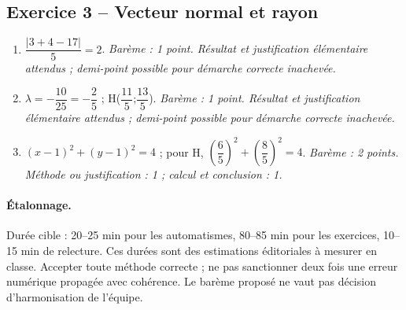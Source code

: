 \subsection*{Exercice 3 -- Vecteur normal et rayon}
\begin{enumerate}
\item $\dfrac{|3+4-17|}{5}=2$. \textit{Barème : 1 point. Résultat et justification élémentaire attendus ; demi-point possible pour démarche correcte inachevée.}
\item $\lambda =-\dfrac{10}{25}=-\dfrac{2}{5}$ ; H($\dfrac{11}{5}$;$\dfrac{13}{5}$). \textit{Barème : 1 point. Résultat et justification élémentaire attendus ; demi-point possible pour démarche correcte inachevée.}
\item $(x-1)^2+(y-1)^2=4$ ; pour H, $(\dfrac{6}{5})^2+(\dfrac{8}{5})^2=4$. \textit{Barème : 2 points. Méthode ou justification : 1 ; calcul et conclusion : 1.}
\end{enumerate}
\paragraph{Étalonnage.} Durée cible : 20–25 min pour les automatismes, 80–85 min pour les exercices, 10–15 min de relecture. Ces durées sont des estimations éditoriales à mesurer en classe. Accepter toute méthode correcte ; ne pas sanctionner deux fois une erreur numérique propagée avec cohérence. Le barème proposé ne vaut pas décision d’harmonisation de l’équipe.
